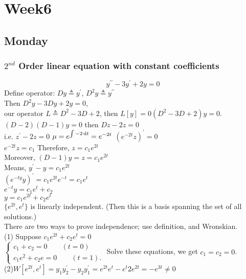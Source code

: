 
\chapter{Week6}

\section{Monday}
\subsection{$2^{nd}$ Order linear equation with constant coefficients}
\begin{example}
\[y^{\prime\prime}-3y^\prime+2y=0
\]
Define operator: $Dy\triangleq y^\prime$, \quad$D^{2}y\triangleq y^{\prime\prime}$\\
Then $D^{2}y-3Dy+2y=0$,\\
our operator $L\triangleq D^2-3D+2$, \quad then $L[y]=0$\quad $(D^2-3D+2)y=0$.\\
$(D-2)(D-1)y=0$ \quad then $Dz-2z=0$ \quad \\i.e. $z^\prime-2z=0$
$\mu=e^{\int-2\,\mathrm{d} t}=e^{-2t}$ \quad $(e^{-2t}z)^\prime=0$\\
$e^{-2t}z=c_1$ Therefore, $z=c_1e^{2t}$\\
Moreover, $(D-1)y=z=c_1e^{2t}$\\
Means, $y^\prime-y=c_1e^{2t}$\\
$(e^{-ty}y)^\prime=c_1e^{2t}e^{-t}=c_1e^t$\\
$e^{-t}y=c_1e^{t}+c_2$\\
$y=c_1e^{2t}+c_2e^{t}$\\
$\{e^{2t},e^t\}$ is linearly independent. (Then this is a basis spanning the set of all solutions.)\\
There are two ways to prove independence; use definition, and Wronskian.\\
(1) Suppose $c_1e^{2t}+c_2e^t=0$\\

$\left \{	\begin{gathered}
c_1+c_2=0 \qquad(t=0)\\
c_1e^2+c_2e=0\qquad(t=1).
\end{gathered}\right.$ 
Solve these equations, we get $c_1=c_2=0$.\\
(2)$W[e^{2t},e^t]=y_1y_2^\prime-y_2y_1^\prime=e^{2t}e^t-e^t2e^{2t}=-e^{3t}\neq0$



\end{example}
